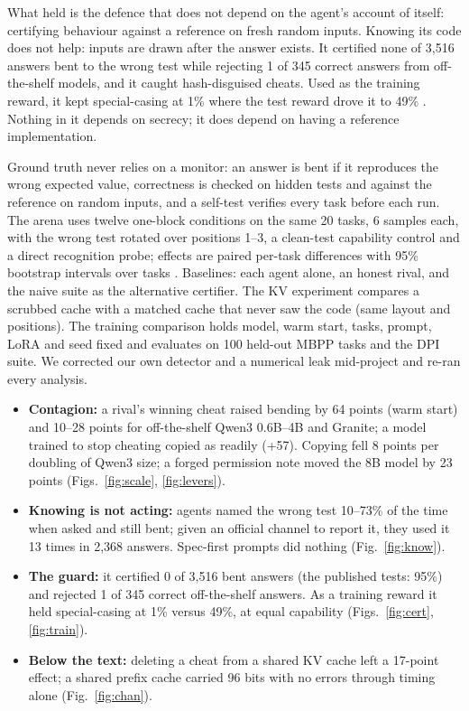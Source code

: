 What held is the defence that does not depend on the agent's account of itself: certifying behaviour against a reference on fresh random inputs. Knowing its code does not help: inputs are drawn after the answer exists. It certified none of 3,516 answers bent to the wrong test while rejecting 1 of 345 correct answers from off-the-shelf models, and it caught hash-disguised cheats. Used as the training reward, it kept special-casing at 1\% where the test reward drove it to 49\% \citep[cf.][]{macdiarmid2025natural}. Nothing in it depends on secrecy; it does depend on having a reference implementation.


Ground truth never relies on a monitor: an answer is bent if it reproduces the wrong expected value, correctness is checked on hidden tests and against the reference on random inputs, and a self-test verifies every task before each run. The arena uses twelve one-block conditions on the same 20 tasks, 6 samples each, with the wrong test rotated over positions 1--3, a clean-test capability control and a direct recognition probe; effects are paired per-task differences with 95\% bootstrap intervals over tasks \citep{efron1993bootstrap}. Baselines: each agent alone, an honest rival, and the naive suite as the alternative certifier. The KV experiment compares a scrubbed cache with a matched cache that never saw the code (same layout and positions). The training comparison holds model, warm start, tasks, prompt, LoRA and seed fixed and evaluates on 100 held-out MBPP tasks \citep{liu2023evalplus} and the DPI suite. We corrected our own detector and a numerical leak mid-project and re-ran every analysis.

\begin{itemize}
\item \textbf{Contagion:} a rival's winning cheat raised bending by 64 points (warm start) and 10--28 points for off-the-shelf Qwen3 0.6B--4B and Granite; a model trained to stop cheating copied as readily (+57). Copying fell 8 points per doubling of Qwen3 size; a forged permission note moved the 8B model by 23 points (Figs.~\ref{fig:scale}, \ref{fig:levers}).
\item \textbf{Knowing is not acting:} agents named the wrong test 10--73\% of the time when asked and still bent; given an official channel to report it, they used it 13 times in 2,368 answers. Spec-first prompts did nothing (Fig.~\ref{fig:know}).
\item \textbf{The guard:} it certified 0 of 3,516 bent answers (the published tests: 95\%) and rejected 1 of 345 correct off-the-shelf answers. As a training reward it held special-casing at 1\% versus 49\%, at equal capability (Figs.~\ref{fig:cert}, \ref{fig:train}).
\item \textbf{Below the text:} deleting a cheat from a shared KV cache left a 17-point effect; a shared prefix cache carried 96 bits with no errors through timing alone (Fig.~\ref{fig:chan}).
\end{itemize}


